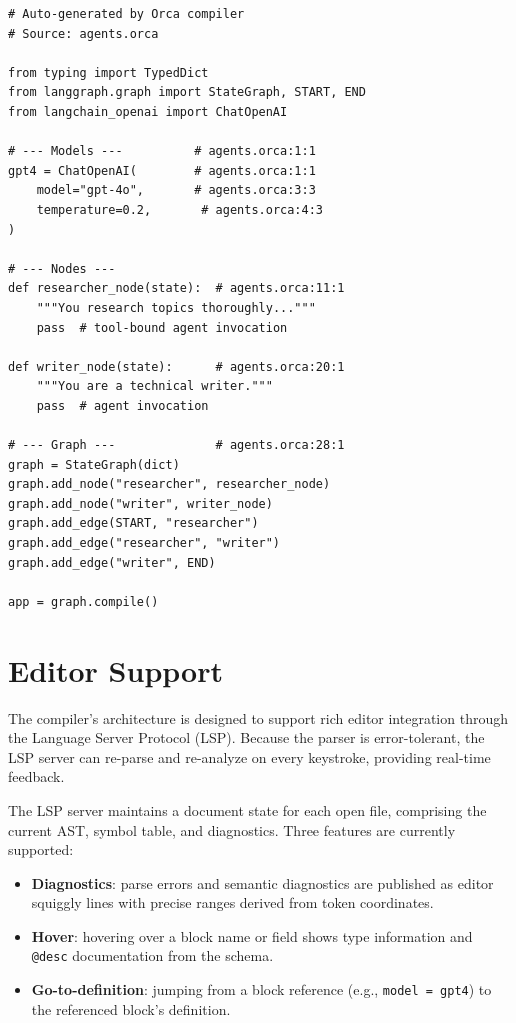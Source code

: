 \documentclass[sigconf,nonacm]{acmart}
\begin{document}
\begin{lstlisting}[style=pythonStyle,caption={Expected generated Python
  for a two-agent workflow (illustrative).},label={fig:generated}]
# Auto-generated by Orca compiler
# Source: agents.orca

from typing import TypedDict
from langgraph.graph import StateGraph, START, END
from langchain_openai import ChatOpenAI

# --- Models ---          # agents.orca:1:1
gpt4 = ChatOpenAI(        # agents.orca:1:1
    model="gpt-4o",       # agents.orca:3:3
    temperature=0.2,       # agents.orca:4:3
)

# --- Nodes ---
def researcher_node(state):  # agents.orca:11:1
    """You research topics thoroughly..."""
    pass  # tool-bound agent invocation

def writer_node(state):      # agents.orca:20:1
    """You are a technical writer."""
    pass  # agent invocation

# --- Graph ---              # agents.orca:28:1
graph = StateGraph(dict)
graph.add_node("researcher", researcher_node)
graph.add_node("writer", writer_node)
graph.add_edge(START, "researcher")
graph.add_edge("researcher", "writer")
graph.add_edge("writer", END)

app = graph.compile()
\end{lstlisting}

\section{Editor Support}
\label{sec:editor}

The compiler's architecture is designed to support rich editor integration
through the Language Server Protocol (LSP). Because the parser is
error-tolerant, the LSP server can re-parse and re-analyze on every
keystroke, providing real-time feedback.

The LSP server maintains a document state for each open file, comprising
the current AST, symbol table, and diagnostics. Three features are
currently supported:

\begin{itemize}[leftmargin=*]
  \item \textbf{Diagnostics}: parse errors and semantic diagnostics are
        published as editor squiggly lines with precise ranges derived from
        token coordinates.
  \item \textbf{Hover}: hovering over a block name or field shows type
        information and \texttt{@desc} documentation from the schema.
  \item \textbf{Go-to-definition}: jumping from a block reference
        (e.g., \texttt{model = gpt4}) to the referenced block's definition.
\end{itemize}
\end{document}
